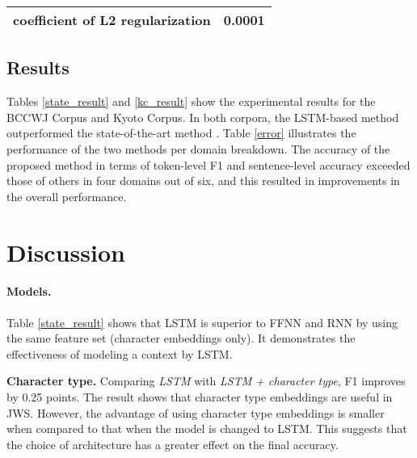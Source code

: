 \documentclass[11pt,letterpaper]{article}
\begin{document}
\begin{table}[t]
\begin{center}
\begin{tabular}{p{50mm}| r }
    coefficient of L2  regularization & 0.0001\\ %
   \bottomrule
     \end{tabular}                                                                                                                                                                                                                                                                                                           
    \end{center}                                                                                                                                                                                                                                                                                                            
 \end{table}
 
                  
\subsection{Results}
Tables \ref{state_result} and \ref{kc_result} show the experimental results for the BCCWJ Corpus and Kyoto Corpus. In both corpora, the LSTM-based method outperformed the state-of-the-art method \cite{neubig-nakata-mori:2011:ACL-HLT2011}. Table \ref{error} illustrates the performance of the two methods per domain breakdown. The accuracy of the proposed method in terms of token-level F1 and sentence-level accuracy exceeded those of others in four domains out of six, and this resulted in improvements in the overall performance.


\section{Discussion}
\paragraph{Models.}
Table \ref{state_result} shows that LSTM is superior to FFNN and RNN by using the same feature set (character embeddings only). It demonstrates the effectiveness of modeling a context by LSTM.

\noindent
{\bf Character type.} Comparing {\it LSTM} with {\it LSTM + character type}, F1 improves by 0.25 points. The result shows that character type embeddings are useful in JWS. However, the advantage of using character type embeddings is smaller when compared to that when the model is changed to LSTM. 
This suggests that the choice of architecture has a greater effect on the final accuracy.
\end{document}
